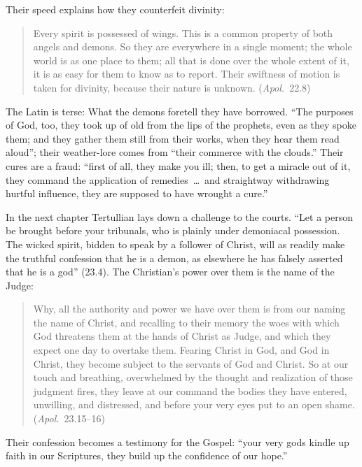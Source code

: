Their speed explains how they counterfeit divinity:
\begin{quote}
Every spirit is possessed of wings. This is a common property of both
angels and demons. So they are everywhere in a single moment; the whole
world is as one place to them; all that is done over the whole extent of
it, it is as easy for them to know as to report. Their swiftness of motion
is taken for divinity, because their nature is unknown.
(\emph{Apol.}\ 22.8)
\end{quote}
\noindent The Latin is terse:  What the demons foretell they have borrowed. ``The purposes
of God, too, they took up of old from the lips of the prophets, even as
they spoke them; and they gather them still from their works, when they
hear them read aloud''; their weather-lore comes from ``their commerce
with the clouds.'' Their cures are a fraud: ``first of all, they make you
ill; then, to get a miracle out of it, they command the application of
remedies~\dots\ and straightway withdrawing hurtful influence, they are
supposed to have wrought a cure.''

In the next chapter Tertullian lays down a challenge to the courts. ``Let
a person be brought before your tribunals, who is plainly under
demoniacal possession. The wicked spirit, bidden to speak by a follower of
Christ, will as readily make the truthful confession that he is a demon,
as elsewhere he has falsely asserted that he is a god'' (23.4). The
Christian's power over them is the name of the Judge:
\begin{quote}
Why, all the authority and power we have over them is from our naming the
name of Christ, and recalling to their memory the woes with which God
threatens them at the hands of Christ as Judge, and which they expect one
day to overtake them. Fearing Christ in God, and God in Christ, they
become subject to the servants of God and Christ. So at our touch and
breathing, overwhelmed by the thought and realization of those judgment
fires, they leave at our command the bodies they have entered, unwilling,
and distressed, and before your very eyes put to an open shame.
(\emph{Apol.}\ 23.15--16)
\end{quote}
\noindent Their confession becomes a testimony for the Gospel: ``your very
gods kindle up faith in our Scriptures, they build up the confidence of
our hope.''

